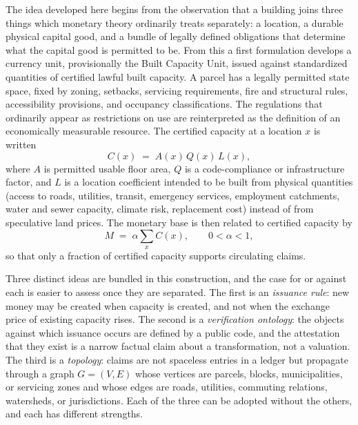 \documentclass[11pt]{article}
\theoremstyle{definition}
\begin{document}
The idea developed here begins from the observation that a building joins three things which monetary theory ordinarily treats separately: a location, a durable physical capital good, and a bundle of legally defined obligations that determine what the capital good is permitted to be. From this a first formulation develops a currency unit, provisionally the Built Capacity Unit, issued against standardized quantities of certified lawful built capacity. A parcel has a legally permitted state space, fixed by zoning, setbacks, servicing requirements, fire and structural rules, accessibility provisions, and occupancy classifications. The regulations that ordinarily appear as restrictions on use are reinterpreted as the definition of an economically measurable resource. The certified capacity at a location $x$ is written
\begin{equation}
C(x) \;=\; A(x)\,Q(x)\,L(x),
\label{eq:capacity}
\end{equation}
where $A$ is permitted usable floor area, $Q$ is a code-compliance or infrastructure factor, and $L$ is a location coefficient intended to be built from physical quantities (access to roads, utilities, transit, emergency services, employment catchments, water and sewer capacity, climate risk, replacement cost) instead of from speculative land prices. The monetary base is then related to certified capacity by
\begin{equation}
M \;=\; \alpha \sum_{x} C(x), \qquad 0<\alpha<1,
\label{eq:base}
\end{equation}
so that only a fraction of certified capacity supports circulating claims.

Three distinct ideas are bundled in this construction, and the case for or against each is easier to assess once they are separated. The first is an \emph{issuance rule}: new money may be created when capacity is created, and not when the exchange price of existing capacity rises. The second is a \emph{verification ontology}: the objects against which issuance occurs are defined by a public code, and the attestation that they exist is a narrow factual claim about a transformation, not a valuation. The third is a \emph{topology}: claims are not spaceless entries in a ledger but propagate through a graph $G=(V,E)$ whose vertices are parcels, blocks, municipalities, or servicing zones and whose edges are roads, utilities, commuting relations, watersheds, or jurisdictions. Each of the three can be adopted without the others, and each has different strengths.
\end{document}

